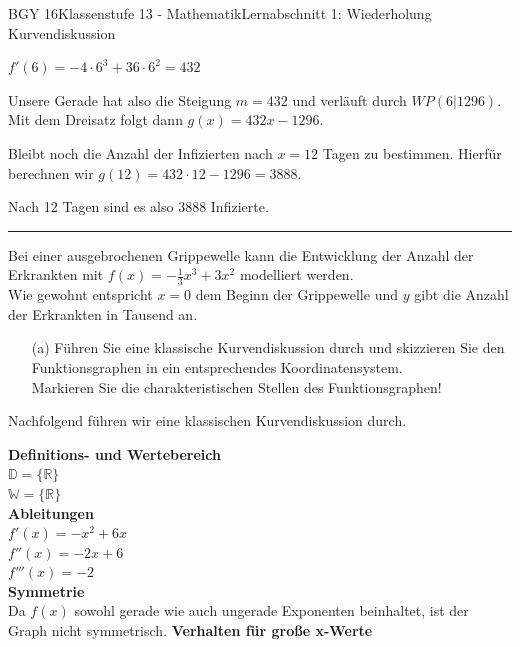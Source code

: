 \documentclass[oneside,openany,headings=optiontotoc,11pt,numbers=noenddot]{scrreprt}
\begin{document}
\begin{worksheet}{BGY 16}{Klassenstufe 13 - Mathematik}{Lernabschnitt 1: Wiederholung Kurvendiskussion}
\begin{framed}
			\par
			\(f'(6) = -4\cdot{}6^3 +36\cdot{}6^2 = 432\)\\
			\par\noindent
			Unsere Gerade hat also die Steigung \(m=432\) und verläuft durch \(WP(6|1296)\). Mit dem Dreisatz folgt dann \(g(x) = 432x-1296\).\\
			\par\noindent
			Bleibt noch die Anzahl der Infizierten nach \(x=12\) Tagen zu bestimmen. Hierfür berechnen wir \underline{\(g(12) = 432\cdot{}12 -1296 = 3888\)}.\\
			\par\noindent
			Nach 12 Tagen sind es also \colorbox{green!10}{3888 Infizierte}.
		\end{framed}
		\rule{\textwidth}{0.1pt}
		\begin{framed}
			\noindent
			Bei einer ausgebrochenen Grippewelle kann die Entwicklung der Anzahl der Erkrankten mit \(f(x) = -\frac{1}{3}x^3 + 3x^2\) modelliert werden.\\
			Wie gewohnt entspricht \(x = 0\) dem Beginn der Grippewelle und \(y\) gibt die Anzahl der Erkrankten in Tausend an.
		\end{framed}
		\begin{itemize}
			\item[(a)] Führen Sie eine klassische Kurvendiskussion durch und skizzieren Sie den Funktionsgraphen in ein entsprechendes Koordinatensystem.\\
			Markieren Sie die charakteristischen Stellen des Funktionsgraphen!
		\end{itemize}
		\begin{framed}
			\noindent
			Nachfolgend führen wir eine klassischen Kurvendiskussion durch.\\
			\par\noindent
			\textbf{Definitions- und Wertebereich}\\
			\(\mathbb{D} = \{\mathbb{R}\}\)\\
			\(\mathbb{W} = \{\mathbb{R}\}\)\\
			\textbf{Ableitungen}\\
			\(f'(x) = -x^2 + 6x\)\\
			\(f''(x) = -2x + 6\)\\
			\(f'''(x) = -2\)\\
			\textbf{Symmetrie}\\
			Da \(f(x)\) sowohl gerade wie auch ungerade Exponenten beinhaltet, ist der Graph \colorbox{green!10}{nicht symmetrisch}.
			\textbf{Verhalten für große x-Werte}\\

\end{framed}
\end{worksheet}
\end{document}
